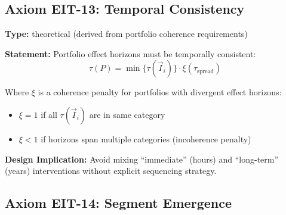 \subsection{Axiom EIT-13: Temporal Consistency}

\begin{tcolorbox}[colback=blue!5!white, colframe=blue!75!black,
    title=\textbf{Axiom EIT-13: Temporal Consistency}]

\textbf{Type:} theoretical (derived from portfolio coherence requirements)

\textbf{Statement:} Portfolio effect horizons must be temporally consistent:
\begin{equation}
\boxed{\tau(P) = \min\{\tau(\vec{I}_i)\} \cdot \xi(\tau_{\text{spread}})}
\label{eq:ie-temporal-consistency}
\end{equation}

Where $\xi$ is a coherence penalty for portfolios with divergent effect horizons:
\begin{itemize}[nosep]
    \item $\xi = 1$ if all $\tau(\vec{I}_i)$ are in same category
    \item $\xi < 1$ if horizons span multiple categories (incoherence penalty)
\end{itemize}

\textbf{Design Implication:} Avoid mixing ``immediate'' (hours) and ``long-term'' (years) interventions without explicit sequencing strategy.

\end{tcolorbox}

\subsection{Axiom EIT-14: Segment Emergence}

